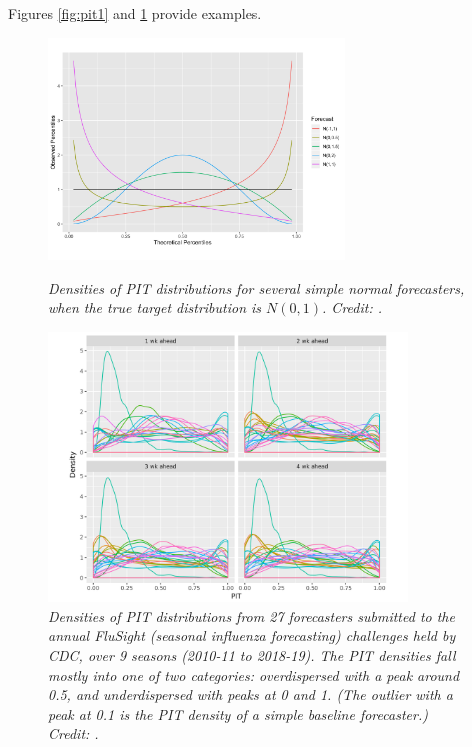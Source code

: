 \documentclass{article}
\begin{document}
Figures \ref{fig:pit1} and \ref{fig:pit2} provide examples.

\begin{figure}[p]
\centering
\includegraphics[width=0.7\textwidth]{pit1.png}
\vspace{-15pt}
\caption{\it Densities of PIT distributions for several simple normal
  forecasters, when the true target distribution is $N(0,1)$. Credit:
  \citet{rumack2022recalibrating}.}        
\label{fig:pit1}   

\bigskip\medskip

\includegraphics[width=0.85\textwidth]{pit2.png}
\caption{\it Densities of PIT distributions from 27 forecasters submitted to the
  annual FluSight (seasonal influenza forecasting) challenges held by CDC, over
  9 seasons (2010-11 to 2018-19). The PIT densities fall mostly into one of two
  categories: overdispersed with a peak around 0.5, and underdispersed with
  peaks at 0 and 1. (The outlier with a peak at 0.1 is the PIT density of a
  simple baseline forecaster.) Credit: \citet{rumack2022recalibrating}.}           
\label{fig:pit2}
\end{figure}
\end{document}
